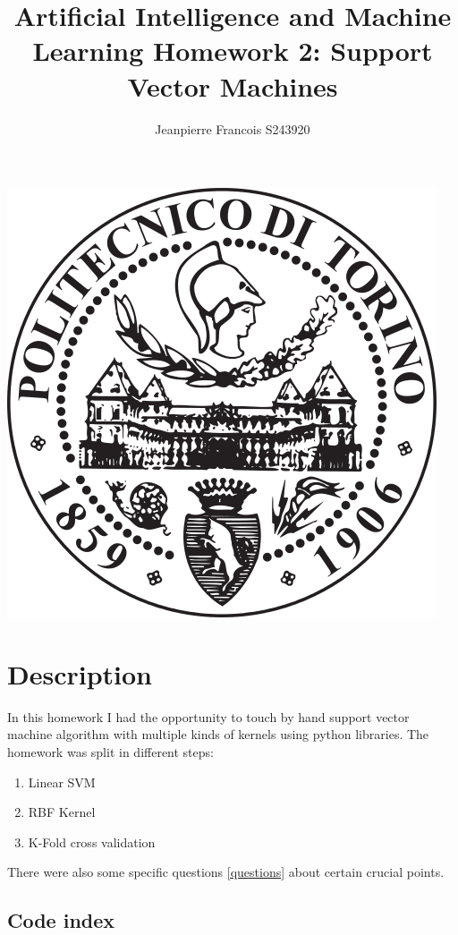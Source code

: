 \documentclass[11pt]{article}
\title{%
    Artificial Intelligence and Machine Learning\newline
    \large \newline Homework 2: Support Vector Machines
    }
\author{Jeanpierre Francois S243920}
\makeatletter
\def\maxwidth{\ifdim\Gin@nat@width>\linewidth\linewidth
  \else\Gin@nat@width\fi}
\let\Oldincludegraphics\includegraphics
\renewcommand{\includegraphics}[1]{\Oldincludegraphics[width=.8\maxwidth]{#1}}
\makeatother
\begin{document}
    \maketitle
    \begin{center}
      \includegraphics{polito_logo.png}
    \end{center}\newpage

\section{Description}\label{description}

In this homework I had the opportunity to touch by hand support vector
machine algorithm with multiple kinds of kernels using python libraries.\newline
The homework was split in different steps:
\begin{enumerate}
  \item Linear SVM
  \item RBF Kernel
  \item K-Fold cross validation
\end{enumerate}

There were also some specific questions \ref{questions} about certain
crucial points.

\subsection{Code index}\label{code-index}
\end{document}
